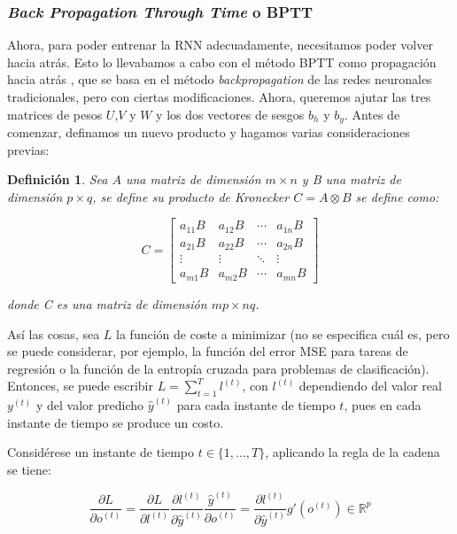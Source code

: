 \documentclass[12pt,twoside]{article}
\newtheorem{definition}[theorem]{Definición}
\begin{document}
\subsubsection{\textit{Back Propagation Through Time} o BPTT}\label{sec:16}

Ahora, para poder entrenar la RNN adecuadamente, necesitamos poder volver hacia atrás. Esto lo llevabamos a cabo con el método BPTT como propagación hacia atrás \cite{rnn3}, que se basa en el método \textit{backpropagation} de las redes neuronales tradicionales, pero con ciertas modificaciones. Ahora, queremos ajutar las tres matrices de pesos $U$,$V$ y $W$ y los dos vectores de sesgos $b_h$ y $b_y$. Antes de comenzar, definamos un nuevo producto y hagamos varias consideraciones previas: 

\begin{definition} Sea $A$ una matriz de dimensión $m \times n$ y B una matriz de dimensión $p \times q$, se define su producto de Kronecker $C = A \otimes B$ se define como:

\begin{equation}
C = 
\begin{bmatrix}
a_{11} B & a_{12} B & \cdots & a_{1n} B \\
a_{21} B & a_{22} B & \cdots & a_{2n} B \\
\vdots   & \vdots   & \ddots & \vdots \\
a_{m1} B & a_{m2} B & \cdots & a_{mn} B
\end{bmatrix}
\end{equation}

donde C es una matriz de dimensión $mp \times nq$.
\end{definition}

Así las cosas, sea $L$ la función de coste a minimizar (no se especifica cuál es, pero se puede considerar, por ejemplo, la función del error MSE para tareas de regresión o la función de la entropía cruzada para problemas de clasificación). Entonces, se puede escribir $L = \sum_{t=1}^{T} l^{(t)}$, con $l^{(t)}$ dependiendo del valor real $y^{(t)}$ y del valor predicho $\hat{y}^{(t)}$ para cada instante de tiempo $t$, pues en cada instante de tiempo se produce un costo.

Considérese un instante de tiempo $t \in \{1,...,T\}$, aplicando la regla de la cadena se tiene: 

\begin{equation}
\frac{\partial L}{\partial o^{(t)}} = \frac{\partial L}{\partial l^{(t)}} \frac{\partial l^{(t)}}{\partial \hat{y}^{(t)}} \frac{\hat{y}^{(t)}}{\partial o^{(t)}} = \frac{\partial l^{(t)}}{\partial \hat{y}^{(t)}} g'(o^{(t)}) \in \mathbb{R}^p
\end{equation}
\end{document}
